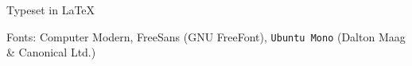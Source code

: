 \documentclass[11pt]{article}
\begin{document}
\vspace{1cm}

{
\begin{center}
\color{gray}
Typeset in \LaTeX\

Fonts: Computer Modern, \textsf{FreeSans} (GNU FreeFont),
\texttt{Ubuntu Mono} (Dalton Maag \& Canonical Ltd.)
\end{center}
}
\end{document}
